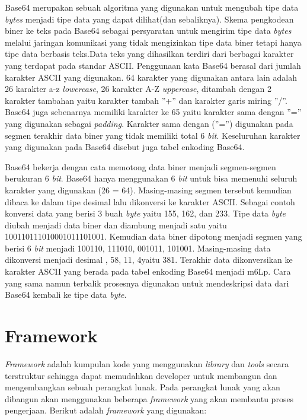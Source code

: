 Base64 merupakan sebuah algoritma yang digunakan untuk mengubah tipe data \textit{bytes} menjadi tipe data yang dapat dilihat(dan sebaliknya). Skema pengkodean biner ke teks pada Base64 sebagai persyaratan untuk mengirim tipe data \textit{bytes} melalui jaringan komunikasi yang tidak mengizinkan tipe data biner tetapi hanya tipe data berbasis teks.Data teks yang dihasilkan terdiri dari berbagai karakter yang terdapat pada standar ASCII. Penggunaan kata Base64 berasal dari jumlah karakter ASCII yang digunakan. 64 karakter yang digunakan antara lain adalah 26 karakter a-z \textit{lowercase}, 26 karakter A-Z \textit{uppercase}, ditambah dengan 2 karakter tambahan yaitu karakter tambah ”+” dan karakter garis miring ”/”. Base64 juga sebenarnya memiliki karakter ke 65 yaitu karakter sama dengan ”=” yang digunakan sebagai \textit{padding}. Karakter sama dengan (”=”) digunakan pada segmen terakhir data biner yang tidak memiliki total 6 \textit{bit}. Keseluruhan karakter yang digunakan pada Base64 disebut juga tabel enkoding Base64.

Base64 bekerja dengan cata memotong data biner menjadi segmen-segmen berukuran 6 \textit{bit}. Base64 hanya menggunakan 6 \textit{bit} untuk bisa memenuhi seluruh karakter yang digunakan (26 = 64). Masing-masing segmen tersebut kemudian dibaca ke dalam tipe desimal lalu dikonversi ke karakter ASCII. Sebagai contoh konversi data yang berisi 3 buah \textit{byte} yaitu 155, 162, dan 233. Tipe data \textit{byte} diubah menjadi data biner dan diambung menjadi satu yaitu 100110111010001011101001. Kemudian data biner dipotong menjadi segmen yang berisi 6 \textit{bit} menjadi 100110, 111010, 001011, 101001. Masing-masing data dikonversi menjadi desimal , 58, 11, 4yaitu 381. Terakhir data dikonversikan ke karakter ASCII yang berada pada tabel enkoding Base64 menjadi m6Lp. Cara yang sama namun terbalik prosesnya digunakan untuk mendeskripsi data dari Base64 kembali ke tipe data \textit{byte}.

\section{Framework}
\label{sec:framework}
\textit{Framework} adalah kumpulan kode yang menggunakan \textit{library} dan \textit{tools} secara terstruktur sehingga dapat memudahkan developer untuk membangun dan mengembangkan sebuah perangkat lunak. Pada perangkat lunak yang akan dibangun akan menggunakan beberapa \textit{framework} yang akan membantu proses pengerjaan. Berikut adalah \textit{framework} yang digunakan:

